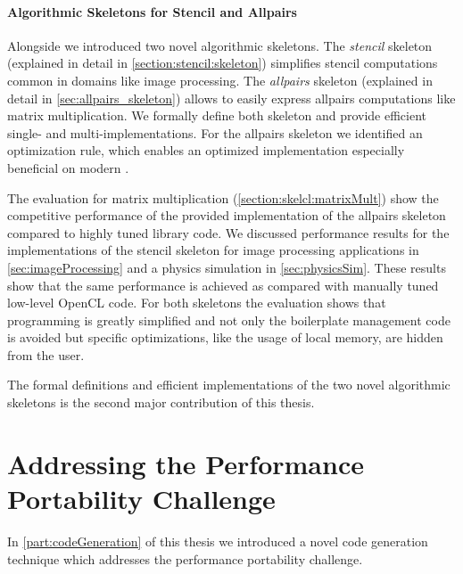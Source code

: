 \paragraph{Algorithmic Skeletons for Stencil and Allpairs}
Alongside \SkelCL we introduced two novel algorithmic skeletons.
The \emph{stencil} skeleton (explained in detail in \autoref{section:stencil:skeleton}) simplifies stencil computations common in domains like image processing.
The \emph{allpairs} skeleton (explained in detail in \autoref{sec:allpairs_skeleton}) allows to easily express allpairs computations like matrix multiplication.
We formally define both skeleton and provide efficient single- and multi-\GPU implementations.
For the allpairs skeleton we identified an optimization rule, which enables an optimized implementation especially beneficial on modern \GPUs.

The evaluation for matrix multiplication (\autoref{section:skelcl:matrixMult}) show the competitive performance of the provided implementation of the allpairs skeleton compared to highly tuned library code.
We discussed performance results for the implementations of the stencil skeleton for image processing applications in \autoref{sec:imageProcessing} and a physics simulation in \autoref{sec:physicsSim}.
These results show that the same performance is achieved as compared with manually tuned low-level OpenCL code.
For both skeletons the evaluation shows that programming is greatly simplified and not only the boilerplate management code is avoided but \GPU specific optimizations, like the usage of local memory, are hidden from the user.

\bigskip
The formal definitions and efficient \GPU implementations of the two novel algorithmic skeletons is the second major contribution of this thesis.


\section{Addressing the Performance Portability Challenge}
In \autoref{part:codeGeneration} of this thesis we introduced a novel code generation technique which addresses the performance portability challenge.

